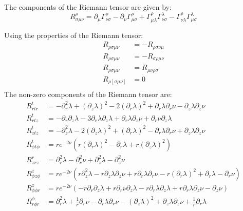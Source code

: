 \documentclass[12pt]{article}
\begin{document}
\begin{appendices}
The components of the Riemann tensor are given by:
\begin{equation}
R_{\sigma\mu\nu}^{\rho}=\partial_{\mu}\Gamma_{\nu\sigma}^{\rho}-\partial_{\nu}\Gamma_{\mu\sigma}^{\rho}+\Gamma_{\mu\lambda}^{\rho}\Gamma_{\nu\sigma}^{\lambda}-\Gamma_{\nu\lambda}^{\rho}\Gamma_{\mu\sigma}^{\lambda}
\end{equation}

Using the properties of the Riemann tensor:
\begin{equation}
\begin{aligned}
R_{\rho\sigma\mu\nu}&=-R_{\rho\sigma\nu\mu}\\
R_{\rho\sigma\mu\nu}&=-R_{\sigma\rho\mu\nu}\\
R_{\rho\sigma\mu\nu}&=R_{\mu\nu\rho\sigma}\\
R_{\rho[\sigma\mu\nu]}&=0\\
\end{aligned}
\end{equation}
The non-zero components of the Riemann tensor are:
\begin{equation}
\begin{aligned}
R^{t}_{rtr}&=-\partial^{2}_{r}\lambda+\left(\partial_{z}\lambda\right)^{2}-2\left(\partial_{r}\lambda\right)^{2}+\partial_{r}\lambda\partial_{r}\nu-\partial_{z}\lambda\partial_{z}\nu\\
R^{t}_{rtz}&=-\partial_{r}\partial_{z}\lambda-3\partial_{r}\lambda\partial_{z}\lambda+\partial_{r}\lambda\partial_{z}\nu+\partial_{r}\nu\partial_{z}\lambda\\
R^{t}_{ztz}&=-\partial^{2}_{z}\lambda-2\left(\partial_{z}\lambda\right)^{2}+\left(\partial_{r}\lambda\right)^{2}-\partial_{r}\lambda\partial_{r}\nu+\partial_{z}\lambda\partial_{z}\nu\\
R^{t}_{\phi t\phi}&=re^{-2\nu}\left(r\left(\partial_{r}\lambda\right)^{2}-\partial_{r}\lambda+r\left(\partial_{z}\lambda\right)^{2}\right)\\
R^{r}_{zrz}&=\partial^{2}_{r}\lambda-\partial^{2}_{r}\nu+\partial^{2}_{z}\lambda-\partial^{2}_{z}\nu\\
R^{z}_{\phi z\phi}&=re^{-2\nu}\left(r\partial^{2}_{z}\lambda-r\partial_{z}\lambda\partial_{z}\nu+r\partial_{r}\lambda\partial_{r}\nu-r\left(\partial_{r}\lambda\right)^{2}+\partial_{r}\lambda-\partial_{r}\nu\right)\\
R^{z}_{\phi\phi r}&=re^{-2\nu}\left(-r\partial_{r}\partial_{z}\lambda+r\partial_{r}\nu\partial_{z}\lambda-r\partial_{r}\lambda\partial_{z}\lambda+r\partial_{r}\lambda\partial_{z}\nu-\partial_{z}\nu\right)\\
R^{\phi}_{r\phi r}&=\partial^{2}_{r}\lambda+\frac{1}{r}\partial_{r}\nu-\partial_{r}\lambda\partial_{r}\nu-\left(\partial_{z}\lambda\right)^{2}+\partial_{z}\lambda\partial_{z}\nu+\frac{1}{r}\partial_{r}\lambda\\
\end{aligned}
\end{equation}


\end{appendices}
\end{document}
